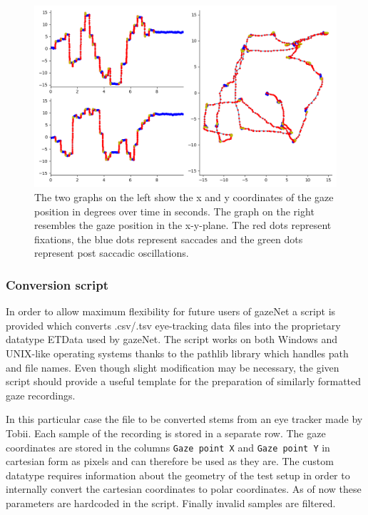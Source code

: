 \documentclass[acmlarge]{acmart}
\begin{document}
\begin{figure}
    \caption{The two graphs on the left show the x and y coordinates of the gaze position in degrees over time in seconds. The graph on the right resembles the gaze position in the x-y-plane. The red dots represent fixations, the blue dots represent saccades and the green dots represent post saccadic oscillations.}
    \label{fig:lund2013}
    \includegraphics[width=\linewidth]{TH34_img_Europe_labelled_MN}
\end{figure}


\subsubsection{Conversion script}
In order to allow maximum flexibility for future users of gazeNet a script is provided which converts .csv/.tsv eye-tracking data files into the proprietary datatype ETData used by gazeNet. The script works on both Windows and UNIX-like operating systems thanks to the pathlib library which handles path and file names. Even though slight modification may be necessary, the given script should provide a useful template for the preparation of similarly formatted gaze recordings. %

In this particular case the file to be converted stems from an eye tracker made by Tobii. Each sample of the recording is stored in a separate row. The gaze coordinates are stored in the columns \verb|Gaze point X| and \verb|Gaze point Y| in cartesian form as pixels and can therefore be used as they are. The custom datatype requires information about the geometry of the test setup in order to internally convert the cartesian coordinates to polar coordinates. As of now these parameters are hardcoded in the script. Finally invalid samples are filtered.
\end{document}
